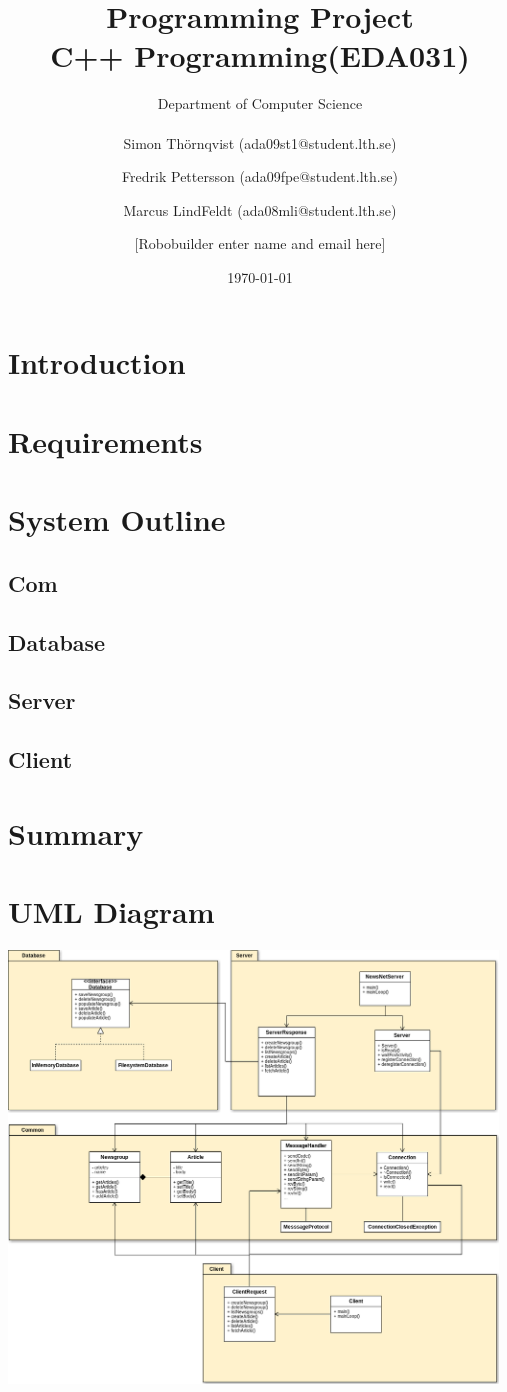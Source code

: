 \documentclass[a4paper, titlepage]{article}
\title{
    Programming Project \\
    C++ Programming(EDA031)
}
\author{
        Department of Computer Science \\
            \\
        Simon Thörnqvist (ada09st1@student.lth.se)
            \and
        Fredrik Pettersson (ada09fpe@student.lth.se)
            \and
        Marcus LindFeldt (ada08mli@student.lth.se)
            \and
        [Robobuilder enter name and email here]
}
\date{\today}
\begin{document}
\maketitle

\section{Introduction}\label{introduction}

\section{Requirements}\label{requirements}

\section{System Outline}\label{systemoutline}
\subsection{Com}

\subsection{Database}

\subsection{Server}

\subsection{Client}

\section{Summary}\label{summary}

\newpage
\appendix
\section{UML Diagram}\label{App:AppendixA}
\includegraphics[width=130mm]{NewsNet_UML.png}
\end{document}
